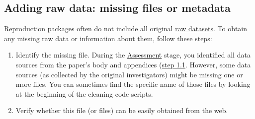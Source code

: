 \documentclass[
  openany]{book}
\providecommand{\tightlist}{%
  \setlength{\itemsep}{0pt}\setlength{\parskip}{0pt}}
\begin{document}
\hypertarget{rd}{%
\subsection{Adding raw data: missing files or metadata}\label{rd}}

Reproduction packages often do not include all original \protect\hyperlink{describe-inputs}{raw datasets}. To obtain any missing raw data or information about them, follow these steps:

\begin{enumerate}
\def\labelenumi{\arabic{enumi}.}
\tightlist
\item
  Identify the missing file. During the \protect\hyperlink{assessment}{Assessment} stage, you identified all data sources from the paper's body and appendices (\protect\hyperlink{desc-sourc.}{step 1.1}. However, some data sources (as collected by the original investigators) might be missing one or more files. You can sometimes find the specific name of those files by looking at the beginning of the cleaning code scripts.\\
\item
  Verify whether this file (or files) can be easily obtained from the web.


\end{enumerate}
\end{document}
